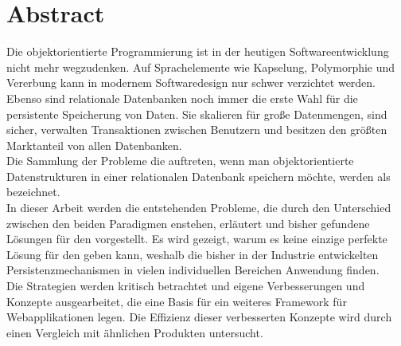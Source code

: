 \chapter*{Abstract}

Die objektorientierte Programmierung ist in der heutigen Softwareentwicklung nicht mehr wegzudenken. Auf Sprachelemente wie Kapselung, Polymorphie und Vererbung kann in modernem Softwaredesign nur schwer verzichtet werden. Ebenso sind relationale Datenbanken noch immer die erste Wahl für die persistente Speicherung von Daten. Sie skalieren für große Datenmengen, sind sicher, verwalten Transaktionen zwischen Benutzern und besitzen den größten Marktanteil von allen Datenbanken. \\
Die Sammlung der Probleme die auftreten, wenn man objektorientierte Datenstrukturen in einer relationalen Datenbank speichern möchte, werden als  bezeichnet. \\
In dieser Arbeit werden die entstehenden Probleme, die durch den Unterschied zwischen den beiden Paradigmen enstehen, erläutert und bisher gefundene Lösungen für den  vorgestellt. Es wird gezeigt, warum es keine einzige perfekte Lösung für den \IM geben kann, weshalb die bisher in der Industrie entwickelten Persistenzmechanismen in vielen individuellen Bereichen Anwendung finden. \\
Die Strategien werden kritisch betrachtet und eigene Verbesserungen und Konzepte ausgearbeitet, die eine Basis für ein weiteres Framework für Webapplikationen legen. Die Effizienz dieser verbesserten Konzepte wird durch einen Vergleich mit ähnlichen Produkten untersucht.
